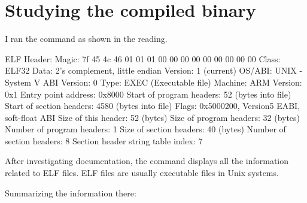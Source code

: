 \section{Studying the compiled binary}

I ran the command  as shown in the reading.

\begin{terminal}
ELF Header:
  Magic:   7f 45 4c 46 01 01 01 00 00 00 00 00 00 00 00 00
  Class:                             ELF32
  Data:                              2's complement, little endian
  Version:                           1 (current)
  OS/ABI:                            UNIX - System V
  ABI Version:                       0
  Type:                              EXEC (Executable file)
  Machine:                           ARM
  Version:                           0x1
  Entry point address:               0x8000
  Start of program headers:          52 (bytes into file)
  Start of section headers:          4580 (bytes into file)
  Flags:                             0x5000200, Version5 EABI, soft-float ABI
  Size of this header:               52 (bytes)
  Size of program headers:           32 (bytes)
  Number of program headers:         1
  Size of section headers:           40 (bytes)
  Number of section headers:         8
  Section header string table index: 7
\end{terminal}

After investigating documentation, the command  displays all the information related to ELF files.
ELF files are usually executable files in Unix systems.

Summarizing the information there:

